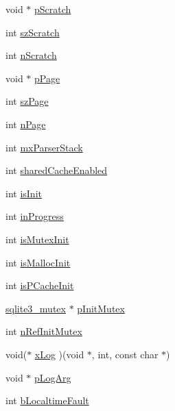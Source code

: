 \begin{DoxyCompactItemize}
\item 
void $\ast$ \hyperlink{struct_sqlite3_config_aafbeaaeee4df0b98598c19a8af6cefed}{p\-Scratch}
\item 
int \hyperlink{struct_sqlite3_config_aed5cee0c084b3298b4f15debdab90272}{sz\-Scratch}
\item 
int \hyperlink{struct_sqlite3_config_a63b88fc0b4f1dd3dfd11edc7ac0f657b}{n\-Scratch}
\item 
void $\ast$ \hyperlink{struct_sqlite3_config_a059fe8443905388d65d741ba655438f9}{p\-Page}
\item 
int \hyperlink{struct_sqlite3_config_aab2aff0daff6b09c1d77299c81892a28}{sz\-Page}
\item 
int \hyperlink{struct_sqlite3_config_a46af661bdb7a466b046a04b032868a36}{n\-Page}
\item 
int \hyperlink{struct_sqlite3_config_a5622c6caef3cd04007517a3a0c5e7ffe}{mx\-Parser\-Stack}
\item 
int \hyperlink{struct_sqlite3_config_ad9837f5e2f338d708234afdb8878184f}{shared\-Cache\-Enabled}
\item 
int \hyperlink{struct_sqlite3_config_a11f18afbc3476ee16d97e75ad770670e}{is\-Init}
\item 
int \hyperlink{struct_sqlite3_config_a3cc1f0564475ead1840892e8ac6989ed}{in\-Progress}
\item 
int \hyperlink{struct_sqlite3_config_af576d567cc36956e0c4c3a7487b53edf}{is\-Mutex\-Init}
\item 
int \hyperlink{struct_sqlite3_config_ab0ec050075ee245df0a54623b0073bfc}{is\-Malloc\-Init}
\item 
int \hyperlink{struct_sqlite3_config_a945ec3af8fd8f2efaccec88e2597393b}{is\-P\-Cache\-Init}
\item 
\hyperlink{structsqlite3__mutex}{sqlite3\-\_\-mutex} $\ast$ \hyperlink{struct_sqlite3_config_af8ffb8388972c384840dd36beca35e7e}{p\-Init\-Mutex}
\item 
int \hyperlink{struct_sqlite3_config_a423f5c1b3f68d9c569661a542ebe7220}{n\-Ref\-Init\-Mutex}
\item 
void($\ast$ \hyperlink{struct_sqlite3_config_a59bd59da6676dc62f9acdd6ff6d27d82}{x\-Log} )(void $\ast$, int, const char $\ast$)
\item 
void $\ast$ \hyperlink{struct_sqlite3_config_a501ab4552bc7c54bb413aced5889dcdc}{p\-Log\-Arg}
\item 
int \hyperlink{struct_sqlite3_config_a7bdc3109ecd839317f722b5da5339fab}{b\-Localtime\-Fault}
\end{DoxyCompactItemize}


